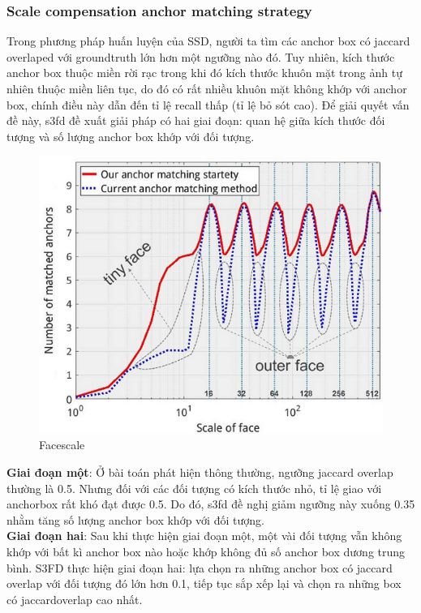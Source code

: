 \documentclass[a4paper]{report}
\begin{document}
\subsubsection{Scale compensation anchor matching strategy}
Trong phương pháp huấn luyện của SSD, người ta tìm các anchor box có jaccard overlaped với groundtruth lớn hơn một ngưỡng nào đó. Tuy nhiên, kích thước anchor box thuộc miền rời rạc trong khi đó kích thước khuôn mặt trong ảnh tự nhiên thuộc miền liên tục, do đó có rất nhiều khuôn mặt không khớp với anchor box, chính điều này dẫn đến tỉ lệ recall thấp (tỉ lệ bỏ sót cao). Để giải quyết vấn đề này, s3fd đề xuất giải pháp có hai giai đoạn:
quan hệ giữa kích thước đối tượng và số lượng anchor box khớp với đối tượng.
\\
\begin{figure}
	\includegraphics[scale=0.35]{3_facescale.png}
	\caption[Caption for LOF]{Facescale \footnotemark[0]} 
\end{figure}
\textbf{Giai đoạn một}: Ở bài toán phát hiện thông thường, ngưỡng jaccard overlap thường là 0.5. Nhưng đối với các đối tượng có kích thước nhỏ, tỉ lệ giao với anchorbox rất khó đạt được 0.5. Do đó, s3fd đề nghị giảm ngưỡng này xuống 0.35 nhằm tăng số lượng anchor box khớp với đối tượng.
\\

\textbf{Giai đoạn hai}: Sau khi thực hiện giai đoạn một, một vài đối tượng vẫn không khớp với bất kì anchor box nào hoặc khớp không đủ số anchor box dương trung bình. S3FD thực hiện giai đoạn hai: lựa chọn ra những anchor box có jaccard overlap với đối tượng đó lớn hơn 0.1, tiếp tục sắp xếp lại và chọn ra những box có jaccardoverlap cao nhất.
\end{document}
